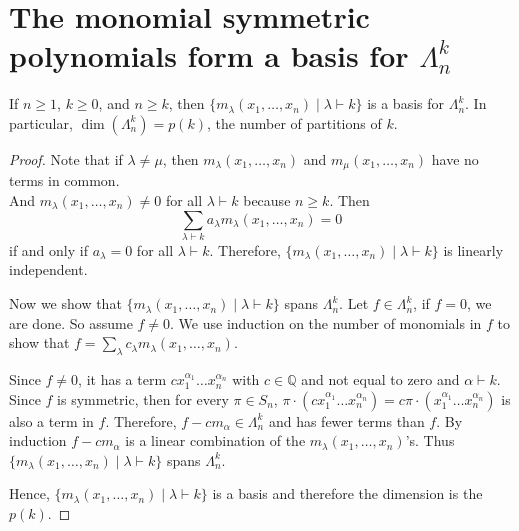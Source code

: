 \documentclass[12pt]{memoir}
\begin{document}
\newpage

\section{The monomial symmetric polynomials form a basis for \texorpdfstring{$\Lambda_n^k$}{Lambda\_n\^{}k}}

\begin{ptcb}
\begin{Prop}
If $n \ge 1$, $k \ge 0$, and $n \ge k$, then $\{m_\lambda(x_1, \dots, x_n) \mid \lambda \vdash k\}$ is a basis for $\Lambda_n^k$. In particular, $\dim(\Lambda_n^k) = p(k)$, the number of partitions of $k$.
\end{Prop}
\end{ptcb}

\begin{proof}
Note that if $\lambda \neq \mu$, then $m_\lambda(x_1, \dots, x_n)$ and $m_\mu(x_1, \dots, x_n)$ have no terms in common.\\
And $m_\lambda(x_1, \dots, x_n) \neq 0$ for all $\lambda \vdash k$ because $n \ge k$. Then
\[
\sum_{\lambda \vdash k} a_\lambda m_\lambda(x_1, \dots, x_n) = 0
\]
if and only if $a_\lambda = 0$ for all $\lambda \vdash k$. Therefore, $\{m_\lambda(x_1, \dots, x_n) \mid \lambda \vdash k\}$ is linearly independent.

Now we show that $\{m_\lambda(x_1, \dots, x_n) \mid \lambda \vdash k\}$ spans $\Lambda_n^k$. Let $f \in \Lambda_n^k$, if $f = 0$, we are done. So assume $f \neq 0$. We use induction on the number of monomials in $f$ to show that $f = \sum_\lambda c_\lambda m_\lambda(x_1, \dots, x_n)$.

Since $f \neq 0$, it has a term $c x_1^{\alpha_1} \dots x_n^{\alpha_n}$ with $c \in \mathbb{Q}$ and not equal to zero and $\alpha \vdash k$. Since $f$ is symmetric, then for every $\pi \in S_n$, $\pi \cdot (c x_1^{\alpha_1} \dots x_n^{\alpha_n}) = c \pi \cdot (x_1^{\alpha_1} \dots x_n^{\alpha_n})$ is also a term in $f$. Therefore, $f - c m_\alpha \in \Lambda_n^k$ and has fewer terms than $f$. By induction $f - c m_\alpha$ is a linear combination of the $m_\lambda(x_1, \dots, x_n)$'s. Thus $\{m_\lambda(x_1, \dots, x_n) \mid \lambda \vdash k\}$ spans $\Lambda_n^k$.

Hence, $\{m_\lambda(x_1, \dots, x_n) \mid \lambda \vdash k\}$ is a basis and therefore the dimension is the $p(k)$.
\end{proof}

\newpage
\end{document}
